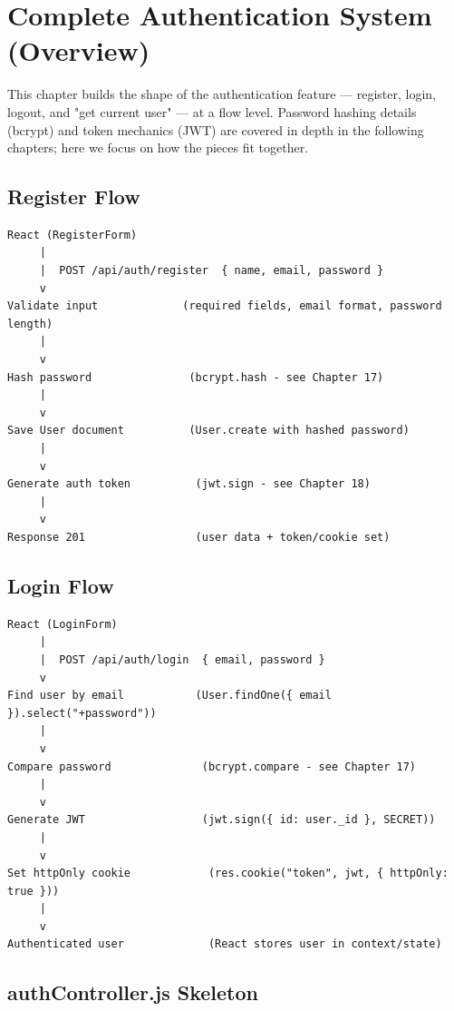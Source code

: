 \chapter{Complete Authentication System (Overview)}

This chapter builds the shape of the authentication feature — register, login,
logout, and "get current user" — at a flow level. Password hashing details
(bcrypt) and token mechanics (JWT) are covered in depth in the following chapters;
here we focus on how the pieces fit together.

\section{Register Flow}

\begin{diagrambox}
\begin{verbatim}
React (RegisterForm)
     |
     |  POST /api/auth/register  { name, email, password }
     v
Validate input             (required fields, email format, password length)
     |
     v
Hash password               (bcrypt.hash - see Chapter 17)
     |
     v
Save User document          (User.create with hashed password)
     |
     v
Generate auth token          (jwt.sign - see Chapter 18)
     |
     v
Response 201                 (user data + token/cookie set)
\end{verbatim}
\end{diagrambox}

\section{Login Flow}

\begin{diagrambox}
\begin{verbatim}
React (LoginForm)
     |
     |  POST /api/auth/login  { email, password }
     v
Find user by email           (User.findOne({ email }).select("+password"))
     |
     v
Compare password              (bcrypt.compare - see Chapter 17)
     |
     v
Generate JWT                  (jwt.sign({ id: user._id }, SECRET))
     |
     v
Set httpOnly cookie            (res.cookie("token", jwt, { httpOnly: true }))
     |
     v
Authenticated user             (React stores user in context/state)
\end{verbatim}
\end{diagrambox}

\section{authController.js Skeleton}

